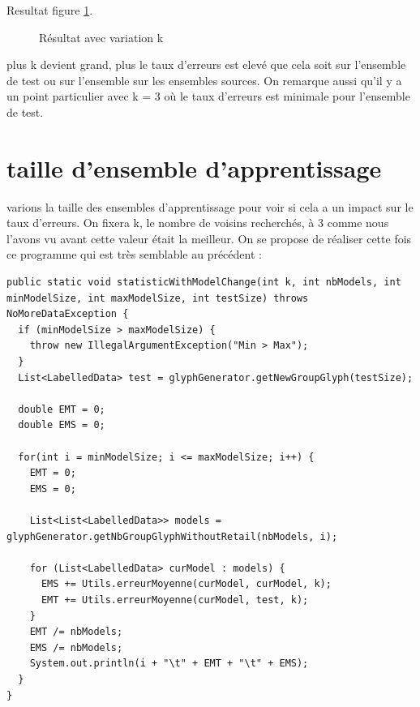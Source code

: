 \documentclass[11pt]{article}
\begin{document}
Resultat figure \ref{r1}.

\begin{figure}[H]
\caption{Résultat avec variation k\label{r1}}	%
\end{figure}

 plus k devient grand, plus le taux d'erreurs est elevé que cela soit sur l'ensemble de test ou sur l'ensemble sur les ensembles sources. On remarque aussi qu'il y a un point particulier avec k = 3 où le taux d'erreurs est minimale pour l'ensemble de test. 

\section{taille d'ensemble d'apprentissage}
varions la taille des ensembles d'apprentissage pour voir si cela a un impact sur le taux d'erreurs. On fixera k, le nombre de voisins recherchés, à 3 comme nous l'avons vu avant cette valeur était la meilleur. On se propose de réaliser cette fois ce programme qui est très semblable au précédent :

\begin{lstlisting}
public static void statisticWithModelChange(int k, int nbModels, int minModelSize, int maxModelSize, int testSize) throws NoMoreDataException {
  if (minModelSize > maxModelSize) {
    throw new IllegalArgumentException("Min > Max");
  }
  List<LabelledData> test = glyphGenerator.getNewGroupGlyph(testSize);
  
  double EMT = 0;
  double EMS = 0;
  
  for(int i = minModelSize; i <= maxModelSize; i++) {
    EMT = 0;
    EMS = 0;
    
    List<List<LabelledData>> models = glyphGenerator.getNbGroupGlyphWithoutRetail(nbModels, i);
    
    for (List<LabelledData> curModel : models) {
      EMS += Utils.erreurMoyenne(curModel, curModel, k);
      EMT += Utils.erreurMoyenne(curModel, test, k);
    }
    EMT /= nbModels;
    EMS /= nbModels;
    System.out.println(i + "\t" + EMT + "\t" + EMS);
  }
}
\end{lstlisting}
\end{document}
